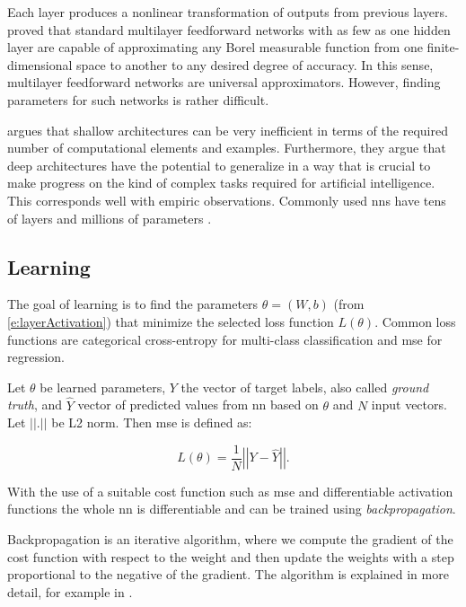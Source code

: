 Each layer produces a nonlinear transformation of outputs from previous layers. \cite{hornik} proved that standard multilayer feedforward networks with as few as one hidden layer are capable of approximating any Borel measurable function from one finite-dimensional space to another to any desired degree of accuracy. In this sense, multilayer feedforward networks are universal approximators. However, finding parameters for such networks is rather difficult.

\cite{bengio2007scaling} argues that shallow architectures can be very inefficient in terms of the required number of computational elements and examples. Furthermore, they argue that deep architectures have the potential to generalize in a way that is crucial to make progress on the kind of complex tasks required for artificial intelligence. This corresponds well with empiric observations. Commonly used \glspl{nn} have tens of layers and millions of parameters \cite{mobilenets, osnet, yolo}.

\subsection{Learning}

The goal of learning is to find the parameters $\theta = (W,b)$ (from \autoref{e:layerActivation}) that minimize the selected loss function $L(\theta)$.  Common loss functions are categorical cross-entropy for multi-class classification and \gls{mse} for regression.

Let $\theta$ be learned parameters, $Y$ the vector of target labels, also called \textit{ground truth}, and $\hat{Y}$ vector of predicted values from \gls{nn} based on $\theta$ and $N$ input vectors. Let $||.||$ be L2 norm. Then \gls{mse} is defined as:

\begin{equation}
    \label{e:mse}
    L(\theta) = \frac{1}{N} \left|\left|Y - \hat{Y}\right|\right|.
\end{equation}

With the use of a suitable cost function such as \gls{mse} and differentiable activation functions the whole \gls{nn} is differentiable and can be trained using \textit{backpropagation}. 

Backpropagation is an iterative algorithm, where we compute the gradient of the cost function with respect to the weight and then update the weights with a step proportional to the negative of the gradient. The algorithm is explained in more detail, for example in \cite{werbos1990backpropagation}.


